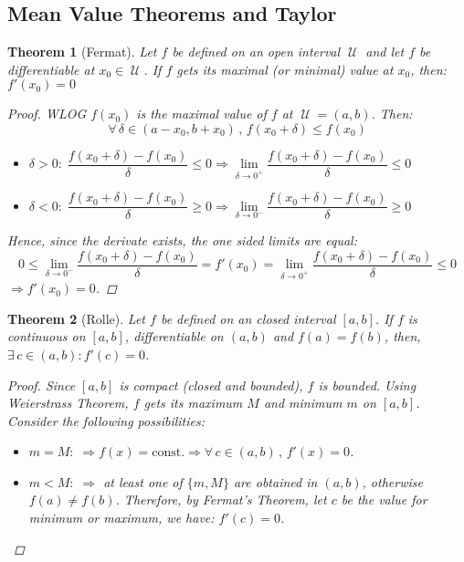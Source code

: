 \documentclass[12pt]{article}
\let\RA\Rightarrow
\newcommand{\Forall}[1]{\forall\,{#1}\,,\,}
\newcommand{\Exist}[1]{\exists\,{#1}:}
\DeclareMathOperator{\U}{\mathcal{U}}
\newtheorem{theorem}{Theorem}[subsection]
\begin{document}
\pagebreak

\subsection{Mean Value Theorems and Taylor}

\begin{theorem}[Fermat]
  Let $f$ be defined on an open interval $\U$ and let $f$ be differentiable at $x_0\in\U$. If $f$ gets its maximal (or minimal) value at $x_0$, then: $f'(x_0)=0$
  \begin{proof}
    WLOG $f(x_0)$ is the maximal value of $f$ at $\U=(a,b)$. Then: $$\Forall{\delta\in (a-x_0,b+x_0)} f(x_0+\delta)\leq f(x_0)$$
    \begin{itemize}
      \item $\delta>0:\;\dfrac{f(x_0+\delta)-f(x_0)}{\delta}\leq 0\RA \lim\limits_{\delta\to 0^{+}}\dfrac{f(x_0+\delta)-f(x_0)}{\delta}\leq 0$
      \item $\delta<0:\;\dfrac{f(x_0+\delta)-f(x_0)}{\delta}\geq 0\RA \lim\limits_{\delta\to 0^{-}}\dfrac{f(x_0+\delta)-f(x_0)}{\delta}\geq 0$
    \end{itemize}
    Hence, since the derivate exists, the one sided limits are equal: $$\displaystyle 0\leq \lim_{\delta\to 0^{-}}\dfrac{f(x_0+\delta)-f(x_0)}{\delta}=f'(x_0)=\lim_{\delta\to 0^{+}}\dfrac{f(x_0+\delta)-f(x_0)}{\delta}\leq 0$$ $\RA f'(x_0)=0$.
  \end{proof}
\end{theorem}

\begin{theorem}[Rolle]
  Let $f$ be defined on an closed interval $[a,b]$. If $f$ is continuous on $[a,b]$, differentiable on $(a,b)$ and $f(a)=f(b)$, then, $\Exist{c\in(a,b)}f'(c)=0$.
  \begin{proof}
    Since $[a,b]$ is compact (closed and bounded), $f$ is bounded. Using Weierstrass Theorem, $f$ gets its maximum $M$ and minimum $m$ on $[a,b]$. Consider the following possibilities:
    \begin{itemize}
      \item $m=M:\;\RA f(x)=\text{const.}\RA \Forall{c\in (a,b)}f'(x)=0$.
      \item $m<M:\;\RA$ at least one of $\{m,M\}$ are obtained in $(a,b)$, otherwise $f(a)\neq f(b)$. Therefore, by Fermat's Theorem, let $c$ be the value for minimum or maximum, we have: $f'(c)=0$.
    \end{itemize}
  \end{proof}
\end{theorem}
\end{document}

